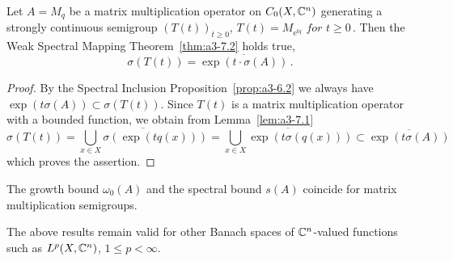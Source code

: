 \begin{theorem}\label{thm:a3-7.2}
Let $A = M_{q}$ be a matrix multiplication operator on $C_{0}(X,\mathbb{C}^{n})$ generating a strongly continuous semigroup $(T(t))_{t\geq 0}$, $T(t) = M_{\mathrm{e}^{tq}} \textit{ for } t \geq 0$\,.
Then the Weak Spectral Mapping Theorem~\ref{thm:a3-7.2} holds true, \ie 
\[
\sigma(T(t)) = \overline{\exp(t\cdot\sigma(A))}\,.
\]

\end{theorem}
\begin{proof}
By the Spectral Inclusion Proposition~\ref{prop:a3-6.2} we always have $\exp(t\sigma(A)) \subset \sigma(T(t))$.
Since $T(t)$ is a matrix multiplication operator with a bounded function, we obtain from Lemma~\ref{lem:a3-7.1}
\[
\sigma(T(t)) = \overline{\bigcup_{x\in X} \sigma(\exp(tq(x)))} = \overline{\bigcup_{x\in X} \exp(t\sigma(q(x)))} \subset \overline{\exp(t\sigma(A))}
\]
which proves the assertion.
\end{proof}
\begin{corollary}\label{cor:a3-7.3}
The growth bound $\omega_{0}(A)$ and the spectral bound $s(A)$ coincide for matrix multiplication semigroups.
\end{corollary}
The above results remain valid for other Banach spaces of $\mathbb{C}^{n}$-valued functions such as $L^{p}(X,\mathbb{C}^{n})$, $1 \leq p < \infty$.

